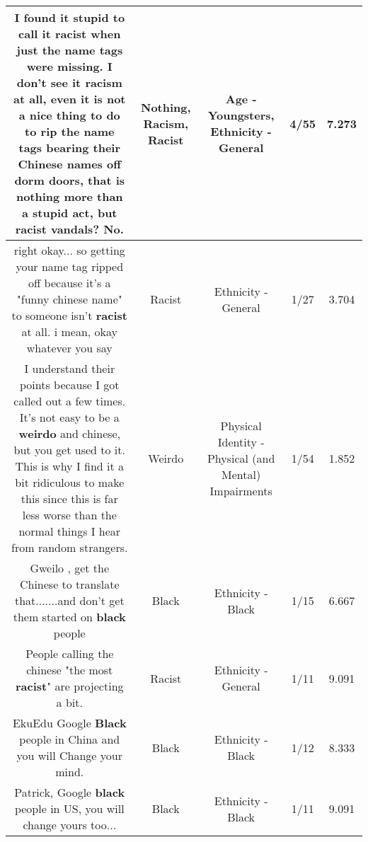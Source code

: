 \documentclass[11pt]{article}
\newlength\mylength
\begin{document}
\begin{center}
\begin{longtable}{|C{.65\mylength}|C{.30\mylength}|C{.12\mylength}|C{.12\mylength}|C{.12\mylength}|}
  \small I found it stupid to call it \textbf{racist} when just the name tags were missing. I don't see it \textbf{racism} at all, even it is not a nice thing to do to rip the name tags bearing their Chinese names off dorm doors, that is \textbf{nothing} more than a stupid act, but \textbf{racist} vandals? No.\normalsize   & Nothing, Racism, Racist & Age - Youngsters, Ethnicity - General & 4/55 & 7.273 \\  \hline
  \small right okay... so getting your name tag ripped off because it's a "funny chinese name" to someone isn't \textbf{racist} at all. i mean, okay whatever you say\normalsize   & Racist & Ethnicity - General & 1/27 & 3.704 \\  \hline
  \small I understand their points because I got called out a few times. It's not easy to be a \textbf{weirdo} and chinese, but you get used to it. This is why I find it a bit ridiculous to make this since this is far less worse than the normal things I hear from random strangers.\normalsize   & Weirdo & Physical Identity - Physical (and Mental) Impairments & 1/54 & 1.852 \\  \hline
  \small Gweilo , get the Chinese to translate that.......and don't get them started on \textbf{black} people\normalsize   & Black & Ethnicity - Black & 1/15 & 6.667 \\  \hline
  \small People calling the chinese "the most \textbf{racist}" are projecting a bit.\normalsize   & Racist & Ethnicity - General & 1/11 & 9.091 \\  \hline
  \small EkuEdu Google \textbf{Black} people in China and you will Change your mind.\normalsize   & Black & Ethnicity - Black & 1/12 & 8.333 \\  \hline
  \small Patrick, Google \textbf{black} people in US, you will change yours too...\normalsize   & Black & Ethnicity - Black & 1/11 & 9.091 \\  \hline

\end{longtable}
\end{center}
\end{document}
